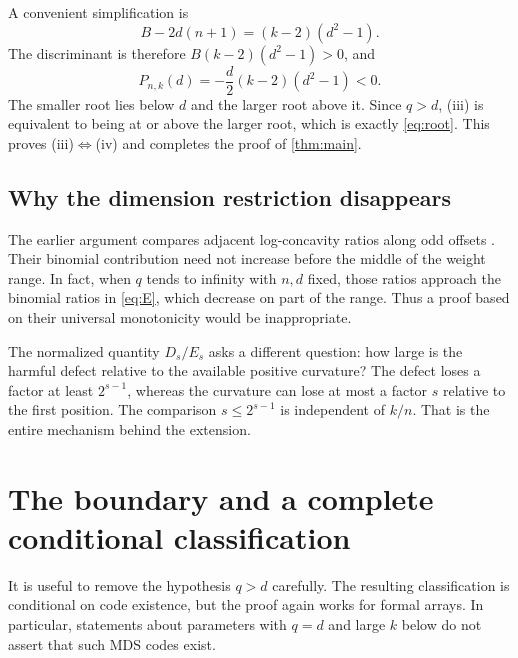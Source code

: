 \documentclass[11pt,letterpaper]{article}
\numberwithin{equation}{section}
\theoremstyle{definition}
\begin{document}
A convenient simplification is
\begin{equation}\label{eq:disc}
 B-2d(n+1)=(k-2)(d^2-1).
\end{equation}
The discriminant is therefore $B(k-2)(d^2-1)>0$, and
\begin{equation}\label{eq:atd}
 P_{n,k}(d)=-\frac d2(k-2)(d^2-1)<0.
\end{equation}
The smaller root lies below $d$ and the larger root above it. Since
$q>d$, (iii) is equivalent to being at or above the larger root,
which is exactly \eqref{eq:root}. This proves (iii)$\Leftrightarrow$(iv)
and completes the proof of \cref{thm:main}.

\subsection{Why the dimension restriction disappears}
The earlier argument compares adjacent log-concavity ratios along
odd offsets \cite[proof of Theorem~9]{SWAK}. Their binomial contribution need not increase before
the middle of the weight range. In fact, when $q$ tends to infinity
with $n,d$ fixed, those ratios approach the binomial ratios in
\eqref{eq:E}, which decrease on part of the range. Thus a proof based
on their universal monotonicity would be inappropriate.

The normalized quantity $D_s/E_s$ asks a different question: how
large is the harmful defect relative to the available positive
curvature? The defect loses a factor at least $2^{s-1}$, whereas the
curvature can lose at most a factor $s$ relative to the first
position. The comparison $s\le2^{s-1}$ is independent of $k/n$.
That is the entire mechanism behind the extension.

\section{The boundary and a complete conditional classification}

It is useful to remove the hypothesis $q>d$ carefully. The resulting
classification is conditional on code existence, but the proof again
works for formal arrays. In particular, statements about parameters
with $q=d$ and large $k$ below do not assert that such MDS codes exist.
\end{document}

